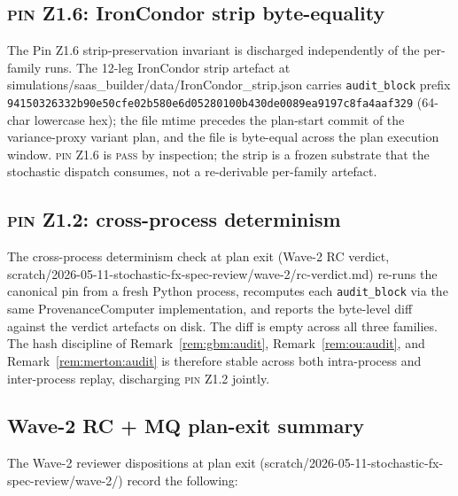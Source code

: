 \documentclass[11pt,letterpaper]{article}
\newcommand{\PinZ}[1]{\textsc{pin Z1.#1}}
\begin{document}
\subsection{\PinZ{6}: IronCondor strip byte-equality}
\label{sec:results:pin-6}

The Pin Z1.6 strip-preservation invariant is discharged independently
of the per-family runs. The 12-leg IronCondor strip artefact at
\textsf{simulations/saas\_builder/data/IronCondor\_strip.json} carries
\texttt{audit\_block} prefix
\texttt{94150326332b90e50cfe02b580e6d05280100b430de0089ea9197c8fa4aaf329}
(64-char lowercase hex); the file mtime precedes the plan-start commit
of the variance-proxy variant plan, and the file is byte-equal across
the plan execution window. \PinZ{6} is \textsc{pass} by inspection;
the strip is a frozen substrate that the stochastic dispatch consumes,
not a re-derivable per-family artefact.

\subsection{\PinZ{2}: cross-process determinism}
\label{sec:results:pin-2}

The cross-process determinism check at plan exit (Wave-2 RC verdict,
\textsf{scratch/2026-05-11-stochastic-fx-spec-review/wave-2/rc-verdict.md})
re-runs the canonical pin from a fresh Python process, recomputes each
\texttt{audit\_block} via the same \textsf{ProvenanceComputer}
implementation, and reports the byte-level diff against the verdict
artefacts on disk. The diff is empty across all three families. The
hash discipline of Remark~\ref{rem:gbm:audit},
Remark~\ref{rem:ou:audit}, and Remark~\ref{rem:merton:audit} is
therefore stable across both intra-process and inter-process replay,
discharging \PinZ{2} jointly.

\subsection{Wave-2 RC + MQ plan-exit summary}
\label{sec:results:wave-2}

The Wave-2 reviewer dispositions at plan exit
(\textsf{scratch/2026-05-11-stochastic-fx-spec-review/wave-2/}) record
the following:
\end{document}
